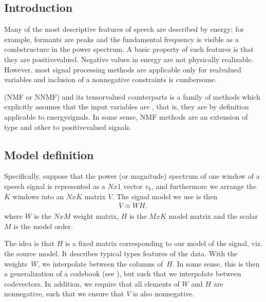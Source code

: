 \documentclass[letterpaper,10pt,english]{jupyterBook}
\begin{document}
\subsection{Introduction}
\label{\detokenize{Modelling/Non-negative_Matrix_and_Tensor_Factorization:introduction}}
\sphinxAtStartPar
Many of the most descriptive features of speech are described by energy;
for example, formants are peaks and the fundamental frequency is visible
as a comb\sphinxhyphen{}structure in the power spectrum. A basic property of such
features is that they are positive\sphinxhyphen{}valued. Negative values in energy are
not physically realizable. However, most signal processing methods are
applicable only for real\sphinxhyphen{}valued variables and inclusion of a
non\sphinxhyphen{}negative constraints is cumbersome.

\sphinxAtStartPar
{} (NMF or NNMF) and its tensor\sphinxhyphen{}valued
counterparts is a family of methods which explicitly assumes that the
input variables are , that is, they are by definition
applicable to energy\sphinxhyphen{}signals. In some sense, NMF methods are an
extension of  \sphinxhyphen{}type
and other {\hyperref[\detokenize{Modelling/Sub-space_models::doc}]{}} to positive\sphinxhyphen{}valued
signals.


\subsection{Model definition}
\label{\detokenize{Modelling/Non-negative_Matrix_and_Tensor_Factorization:model-definition}}
\sphinxAtStartPar
Specifically, suppose that the power (or magnitude) spectrum of one
window of a speech signal is represented as a \(Nx1\) vector
\(v_k\), and furthermore we arrange the \(K\) windows into an
\(NxK\) matrix \(V\). The signal model we use is then
\begin{equation*}
\begin{split} V \approx WH, \end{split}
\end{equation*}
\sphinxAtStartPar
where \(W\) is the \(NxM\) weight matrix, \(H\) is the \(MxK\) model matrix and
the scalar \(M\) is the model order.

\sphinxAtStartPar
The idea is that \(H\) is a fixed matrix corresponding to our model of the
signal, viz. the source model. It describes typical types features of
the data. With the weights \(W\), we interpolate between the columns
of \(H\). In some sense, this is then a generalization of a codebook (see
), but such that we
interpolate between codevectors. In addition, we require that all
elements of \(W\) and \(H\) are non\sphinxhyphen{}negative, such that we ensure that \(V\)
is also non\sphinxhyphen{}negative.
\end{document}
